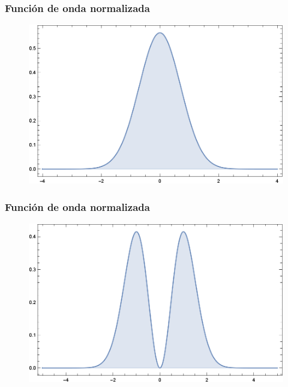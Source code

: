 \documentclass[12pt]{beamer}
\begin{document}
\begin{frame}
\frametitle{Función de onda normalizada}
\begin{figure}
    \centering
    \includegraphics[scale=0.75]{Imagenes/Funcion_Onda_Normalizada_Psi_0.eps}
\end{figure}
\end{frame}
\begin{frame}
\frametitle{Función de onda normalizada}
\begin{figure}
    \centering
    \includegraphics[scale=0.75]{Imagenes/Funcion_Onda_Normalizada_Psi_1.eps}
\end{figure}
\end{frame}
\end{document}
